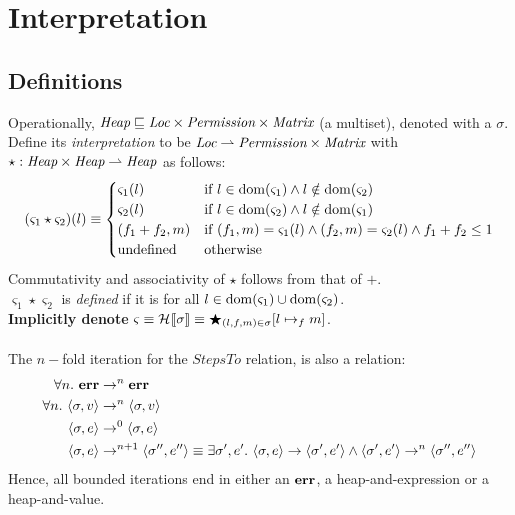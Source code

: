 \section{Interpretation}

\subsection{Definitions}


Operationally, $\emph{Heap} \sqsubseteq \emph{Loc} \times \emph{Permission}
\times \emph{Matrix} $ (a multiset), denoted with a $\sigma$.\\
Define its \emph{interpretation} to be $\emph{Loc} \rightharpoonup
\emph{Permission} \times \emph{Matrix}$ with $\star:
\emph{Heap} \times \emph{Heap} \rightharpoonup \emph{Heap}$ as follows:
\[
    (\varsigma_1 \star \varsigma_2)(l) \equiv
    \begin{cases}
        \varsigma_1(l) & \textrm{if } l \in \mathrm{dom}(\varsigma_1) \wedge l \notin \mathrm{dom}(\varsigma_2) \\
        \varsigma_2(l) & \textrm{if } l \in \mathrm{dom}(\varsigma_2) \wedge l \notin \mathrm{dom}(\varsigma_1) \\
        (f_1 + f_2, m) & \textrm{if } (f_1, m) = \varsigma_1(l) \wedge (f_2, m) = \varsigma_2(l) \wedge f_1 + f_2 \leq 1 \\
        \textrm{undefined} & \textrm{otherwise}
    \end{cases}
\]
Commutativity and associativity of $\star$ follows from that of $+$.\\
$\varsigma_1 \star \varsigma_2$ is \emph{defined} if it is for all $l \in
\mathrm{dom}(\varsigma_1) \cup \mathrm{dom}(\varsigma_2)$.\\
\textbf{Implicitly denote} $\varsigma \equiv \mathcal{H}_{} [\![ \sigma ]\!] \equiv
\bigstar_{(l,f,m) \in \sigma} [ l \mapsto_f m ]$.\\
\\
The $n-$fold iteration for the $StepsTo$ relation, is also a relation:
\begin{align*}
    \forall n.\ \mathbf{err} &\rightarrow^n \mathbf{err}\\
    \forall n.\ \langle \sigma , v \rangle &\rightarrow^n \langle \sigma , v \rangle\\
    \langle \sigma , e \rangle &\rightarrow^0 \langle \sigma , e \rangle\\
    \langle \sigma , e \rangle &\rightarrow^{n+1} \langle \sigma'', e'' \rangle
    \equiv \exists \sigma', e'.\ \langle \sigma , e \rangle \rightarrow \langle
    \sigma' , e' \rangle \wedge \langle \sigma' , e' \rangle \rightarrow^n
    \langle \sigma'', e'' \rangle
\end{align*}
Hence, all bounded iterations end in either an $\mathbf{err}$, a heap-and-expression or a
heap-and-value.

